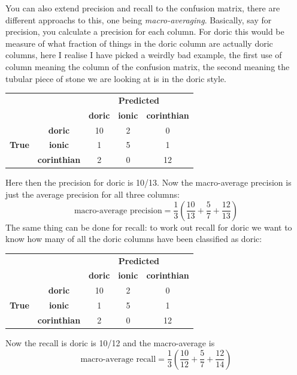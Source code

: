 \documentclass[12pt]{article}
\begin{document}
You can also extend precision and recall to the confusion matrix,
there are different approachs to this, one being
\textsl{macro-averaging}. Basically, say for precision, you calculate
a precision for each column. For \color{red}doric\color{black}{} this
would be measure of what fraction of things in the doric column are
actually doric columns, here I realise I have picked a weirdly bad
example, the first use of column meaning the column of the confusion
matrix, the second meaning the tubular piece of stone we are looking
at is in the doric style.
\begin{center}
\begin{tabular}{|c|c|c|c|c|}
\cline{3-5}
\multicolumn{1}{c}{}&\multicolumn{1}{c|}{}&\multicolumn{3}{c|}{\textbf{Predicted}} \\ \cline{3-5} 
\multicolumn{1}{c}{}&\multicolumn{1}{c|}{}& \color{red}\textbf{doric} & \textbf{ionic} & \textbf{corinthian} \\ \hline
\multirow{3}{*}{\textbf{True}}&
\textbf{doric} & \color{red}10 & 2 & 0 \\ \cline{2-5}
&\textbf{ionic} & \color{red}1 & 5 & 1 \\ \cline{2-5}
&\textbf{corinthian} & \color{red}2 & 0 & 12 \\ \cline{1-5}
\end{tabular}
\end{center}
Here then the precision for doric is 10/13. Now the macro-average
precision is just the average precision for all three columns:
\begin{equation}
  \mbox{macro-average precision}=\frac{1}{3}\left(\frac{10}{13}+\frac{5}{7}+\frac{12}{13}\right)
\end{equation}
The same thing can be done for recall: to work out recall for doric we want to know how many of all the doric columns have been classified as doric:
\begin{center}
\begin{tabular}{|c|c|c|c|c|}
\cline{3-5}
\multicolumn{1}{c}{}&\multicolumn{1}{c|}{}&\multicolumn{3}{c|}{\textbf{Predicted}} \\ \cline{3-5} 
\multicolumn{1}{c}{}&\multicolumn{1}{c|}{}& \textbf{doric} & \textbf{ionic} & \textbf{corinthian} \\ \hline
\multirow{3}{*}{\textbf{True}}&
\textbf{\color{red}doric} & \color{red}10 & \color{red}2 & \color{red}0 \\ \cline{2-5}
&\textbf{ionic} & 1 & 5 & 1 \\ \cline{2-5}
&\textbf{corinthian} & 2 & 0 & 12 \\ \cline{1-5}
\end{tabular}
\end{center}
Now the recall is doric is 10/12 and the macro-average is
\begin{equation}
  \mbox{macro-average recall}=\frac{1}{3}\left(\frac{10}{12}+\frac{5}{7}+\frac{12}{14}\right)
\end{equation}
\end{document}
